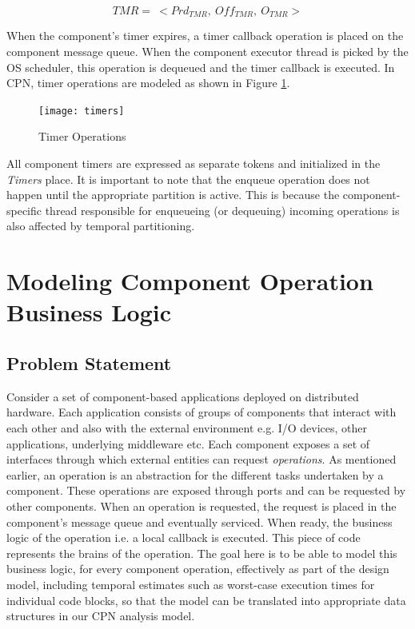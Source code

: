 \begin{equation}
\label{eq:TMR}
TMR = \ < Prd_{TMR}, \ Off_{TMR}, \ O_{TMR}>
\end{equation} 

When the component's timer expires, a timer callback operation is placed on the component message queue. When the component executor thread is picked by the OS scheduler, this operation is dequeued and the timer callback is executed. In CPN, timer operations are modeled as shown in Figure \ref{fig:cpn_timers}. 

\begin{figure}[ht]
	\centering
	\texttt{[image: timers]}
	\caption{Timer Operations}
	\label{fig:cpn_timers}
\end{figure}

All component timers are expressed as separate tokens and initialized in the \emph{Timers} place. It is important to note that the enqueue operation does not happen until the appropriate partition is active. This is because the component-specific thread responsible for enqueueing (or dequeuing) incoming operations is also affected by temporal partitioning. 

\section{Modeling Component Operation Business Logic}
\label{sec:BL_Model}

\subsection{Problem Statement}

Consider a set of component-based applications deployed on distributed hardware. Each application consists of groups of components that interact with each other and also with the external environment e.g. I/O devices, other applications, underlying middleware etc. Each component exposes a set of interfaces through which external entities can request \emph{operations}. As mentioned earlier, an operation is an abstraction for the different tasks undertaken by a component. These operations are exposed through ports and can be requested by other components. When an operation is requested, the request is placed in the component's message queue and eventually serviced. When ready, the business logic of the operation i.e. a local callback is executed. This piece of code represents the brains of the operation. The goal here is to be able to model this business logic, for every component operation, effectively as part of the design model, including temporal estimates such as worst-case execution times for individual code blocks, so that the model can be translated into appropriate data structures in our CPN analysis model.

